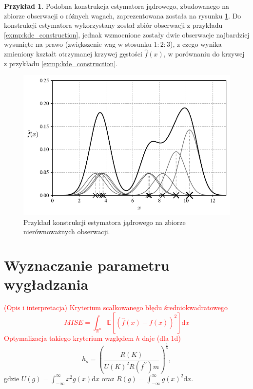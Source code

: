 \documentclass[12pt,a4paper,oneside]{book}
\theoremstyle{definition}
\newtheorem{exmp}{Przykład}[chapter]
\begin{document}
\begin{exmp}
Podobna konstrukcja estymatora jądrowego, zbudowanego na zbiorze obserwacji o różnych wagach, zaprezentowana została na rysunku \ref{fig:kde_construction_weighted}. Do konstrukcji estymatora wykorzystany został zbiór obserwacji z przykładu \ref{exmp:kde_construction}, jednak wzmocnione zostały dwie obserwacje najbardziej wysunięte na prawo (zwiększenie wag w stosunku $1:2:3$), z czego wynika zmieniony kształt otrzymanej krzywej gęstości $\hat{f}(x)$, w porównaniu do krzywej z przykładu \ref{exmp:kde_construction}.

\begin{figure}[H]
    \centering
    \includegraphics[scale=0.7]{kde_construction_weighted}
    \caption{Przykład konstrukcji estymatora jądrowego na zbiorze nierównoważnych obserwacji.}
    \label{fig:kde_construction_weighted}
\end{figure}
\end{exmp}

\section{Wyznaczanie parametru wygładzania} \label{sec:bandwidth_selection}

\textcolor{red}{(Opis i interpretacja) Kryterium scałkowanego błędu średniokwadratowego
\begin{equation} \label{eq:mise}
MISE = \int_{\mathbb{R}^n} \mathbb{E}[(\hat{f}(x) - f(x))^2] \mathrm{d}x
\end{equation}
Optymalizacja takiego kryterium względem $h$ daje (dla 1d)}
\begin{equation} \label{eq:opt_bandwidth1}
h_o = \left( \frac{R(K)}{U(K)^2 R(f^{\prime\prime}) m} \right)^\frac{1}{5},
\end{equation}
gdzie $U(g) = \int_{-\infty}^\infty x^2 g(x) \mathrm{d}x$ oraz $R(g) = \int_{-\infty}^\infty g(x)^2\mathrm{d}x$.
\end{document}

